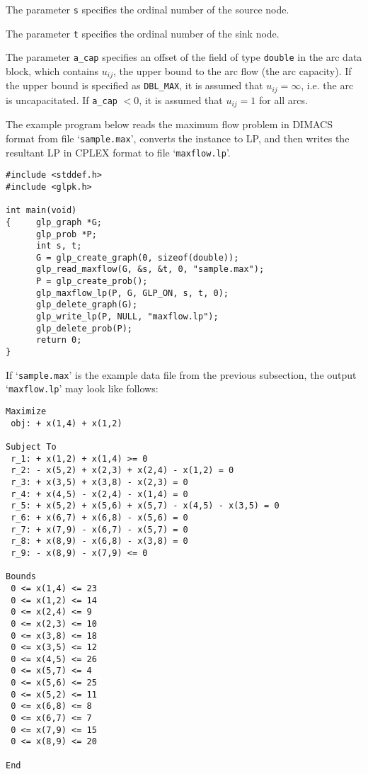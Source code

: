 \documentclass[11pt]{report}
\def\para#1{\noindent{\bf#1}}
\begin{document}
The parameter \verb|s| specifies the ordinal number of the source node.

The parameter \verb|t| specifies the ordinal number of the sink node.

The parameter \verb|a_cap| specifies an offset of the field of type
\verb|double| in the arc data block, which contains $u_{ij}$, the upper
bound to the arc flow (the arc capacity). If the upper bound is
specified as \verb|DBL_MAX|, it is assumed that $u_{ij}=\infty$, i.e.
the arc is uncapacitated. If \verb|a_cap| $<0$, it is assumed that
$u_{ij}=1$ for all arcs.

\para{Example}

The example program below reads the maximum flow problem in DIMACS
format from file `\verb|sample.max|', converts the instance to LP, and
then writes the resultant LP in CPLEX format to file
`\verb|maxflow.lp|'.

\begin{footnotesize}
\begin{verbatim}
#include <stddef.h>
#include <glpk.h>

int main(void)
{     glp_graph *G;
      glp_prob *P;
      int s, t;
      G = glp_create_graph(0, sizeof(double));
      glp_read_maxflow(G, &s, &t, 0, "sample.max");
      P = glp_create_prob();
      glp_maxflow_lp(P, G, GLP_ON, s, t, 0);
      glp_delete_graph(G);
      glp_write_lp(P, NULL, "maxflow.lp");
      glp_delete_prob(P);
      return 0;
}
\end{verbatim}
\end{footnotesize}

If `\verb|sample.max|' is the example data file from the previous
subsection, the output `\verb|maxflow.lp|' may look like follows:

\newpage

\begin{footnotesize}
\begin{verbatim}
Maximize
 obj: + x(1,4) + x(1,2)

Subject To
 r_1: + x(1,2) + x(1,4) >= 0
 r_2: - x(5,2) + x(2,3) + x(2,4) - x(1,2) = 0
 r_3: + x(3,5) + x(3,8) - x(2,3) = 0
 r_4: + x(4,5) - x(2,4) - x(1,4) = 0
 r_5: + x(5,2) + x(5,6) + x(5,7) - x(4,5) - x(3,5) = 0
 r_6: + x(6,7) + x(6,8) - x(5,6) = 0
 r_7: + x(7,9) - x(6,7) - x(5,7) = 0
 r_8: + x(8,9) - x(6,8) - x(3,8) = 0
 r_9: - x(8,9) - x(7,9) <= 0

Bounds
 0 <= x(1,4) <= 23
 0 <= x(1,2) <= 14
 0 <= x(2,4) <= 9
 0 <= x(2,3) <= 10
 0 <= x(3,8) <= 18
 0 <= x(3,5) <= 12
 0 <= x(4,5) <= 26
 0 <= x(5,7) <= 4
 0 <= x(5,6) <= 25
 0 <= x(5,2) <= 11
 0 <= x(6,8) <= 8
 0 <= x(6,7) <= 7
 0 <= x(7,9) <= 15
 0 <= x(8,9) <= 20

End
\end{verbatim}
\end{footnotesize}
\end{document}
